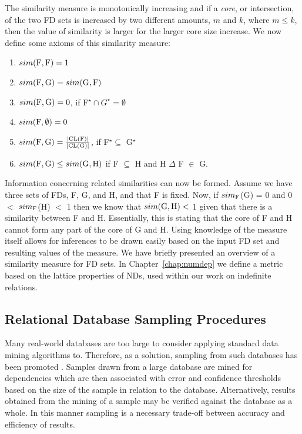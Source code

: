 The similarity measure is monotonically increasing and if a {\em
core}, or intersection, of the two FD sets is
increased by two different amounts, $m$ and $k$, where $m \le k$, then
the value of similarity is larger for the larger core size
increase. We now define some axioms of this similarity measure:
\begin{enumerate}
\item $sim({\rm F}, {\rm F}) = 1$
\item $sim({\rm F}, {\rm G}) = sim({\rm G}, {\rm F})$
\item $sim({\rm F}, {\rm G}) = 0$, if F$^\star \cap G^\star = \emptyset$
\item $sim({\rm F}, \emptyset) = 0$
\item $sim({\rm F}, {\rm G}) = \frac{|{\rm CL(F)}|}{ |{\rm CL(G)}|}$, if F$^\star \subseteq$ G$^\star$
\item  $sim({\rm F},{\rm G}) \le sim({\rm G},{\rm H})$ if F
$\subseteq$ H and H $\Delta$ F $\in$ G. 
\end{enumerate}

Information concerning related similarities can now be formed. Assume we
have three sets of FDs, F, G, and H, and that F is
fixed. Now, if $sim_{\rm F}$(G) = 0 and 0 $<$ $sim_{\rm F}$(H) $<$ 1
then we know 
that $sim({\rm G},{\rm H}) <$ 1 given that there is a similarity between F and
H. Essentially, this is stating that the core of F and H cannot 
form any part of the core of G and H. Using 
knowledge of the measure itself allows for inferences to be drawn
easily based on the input FD set and resulting values of the
measure. We have briefly
presented an overview of a similarity measure for FD sets. In
Chapter~\ref{chap:numdep} we define a metric based on the lattice
properties of NDs, used within our work on indefinite relations.

\subsection{Relational Database Sampling Procedures}\label{subsec:dat_samp}

Many real-world databases are too large to consider applying standard
data mining algorithms to. Therefore, as a solution, sampling from
such databases has been promoted \cite{km94,toi96b}. Samples drawn
from a large database are mined for dependencies which are then
associated with error and confidence thresholds based on the size of
the sample in relation to the database. Alternatively, results
obtained from the mining of a sample may be verified against the
database as a whole. In this manner sampling is a necessary trade-off
between accuracy and efficiency of results.

